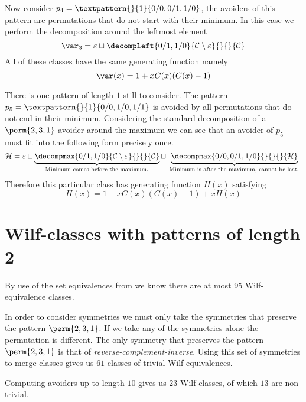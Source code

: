 Now consider \(p_4 = \textpattern{}{1}{0/0,0/1,1/0}\), the avoiders of this
pattern are permutations that do not start with their minimum. In this case we
perform the decomposition around the leftmost element
\begin{equation*}
    \mathcal{\var}_3 =\varepsilon \sqcup \decompleft{0/1,1/0}{\mathcal{C}\setminus\varepsilon}{}{}{\mathcal{C}}
\end{equation*}
All of these classes have the same generating function namely
\begin{equation*}
    \var(x) = 1 + xC(x)(C(x)-1)
\end{equation*}

There is one pattern of length \(1\) still to consider. The pattern
\(p_5 = \textpattern{}{1}{0/0,1/0,1/1}\) is avoided by all permutations
that do not end in their minimum. Considering the standard decomposition
of a \(\perm{2,3,1}\) avoider around the maximum we can see that an avoider
of \(p_5\) must fit into the following form precisely once.
\begin{equation*}
    \mathcal{H} = \varepsilon \sqcup
    \underbrace{\decompmax{0/1,1/0}{\mathcal{C}\setminus\varepsilon}{}{}{\mathcal{C}}}_\text{
        Minimum comes before the maximum.
    } \sqcup
    \underbrace{\decompmax{0/0,0/1,1/0}{}{}{}{\mathcal{H}}}_\text{
        Minimum is after the maximum, cannot be last.
    }
\end{equation*}
Therefore this particular class has generating function \(H(x)\) satisfying
\begin{equation*}
    H(x) = 1 + xC(x)(C(x)-1) + xH(x)
\end{equation*}

\section{Wilf-classes with patterns of length 2}
By use of the set equivalences from  we know there are
at most \(95\) Wilf-equivalence classes.

In order to consider symmetries we must only take the symmetries that preserve
the pattern \(\perm{2,3,1}\). If we take any of the symmetries alone the
permutation is different. The only symmetry that preserves the pattern
\(\perm{2,3,1}\) is that of \emph{reverse-complement-inverse}. Using this
set of symmetries to merge classes gives us \(61\) classes of trivial
Wilf-equivalences.

Computing avoiders up to length \(10\) gives us \(23\) Wilf-classes,
of which \(13\) are non-trivial.

